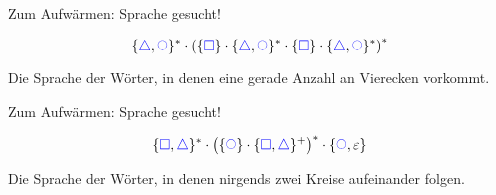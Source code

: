\begin{frame}{Zum Aufwärmen: Sprache gesucht!}
	
	$$ \{\mword \triangle, \mword \mycircle\}^* \cdot \left( \{\mword \square\} \cdot \{\mword \triangle, \mword \mycircle\}^* \cdot \{\mword \square\} \cdot \{\mword \triangle, \mword \mycircle\}^* \right)^* $$
	\bigskip
	\pause
	
	Die Sprache der Wörter, in denen eine gerade Anzahl an Vierecken vorkommt.

\end{frame}

\begin{frame}{Zum Aufwärmen: Sprache gesucht!}
	
	$$ \{\mword \square, \mword \triangle\}^* \cdot \left( \{\mword \mycircle\} \cdot \{\mword \square, \mword \triangle\}^+ \right)^* \cdot \{\mword \mycircle, \varepsilon\} $$
	\bigskip
	\pause

	Die Sprache der Wörter, in denen nirgends zwei Kreise aufeinander folgen.
\end{frame}